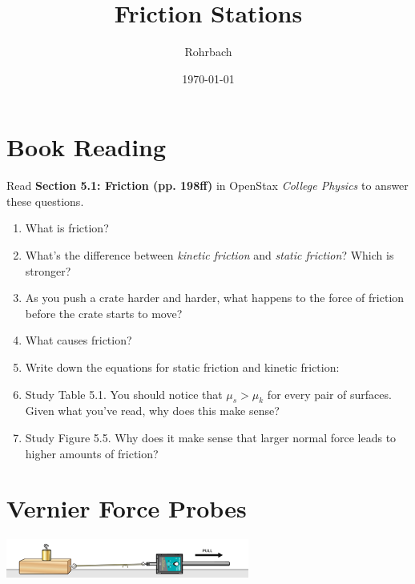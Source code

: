 \documentclass[10pt]{exam}
\title{Friction Stations}
\author{Rohrbach}
\date{\today}
\begin{document}
\maketitle


\section{Book Reading} \label{book}

Read {\bf Section 5.1: Friction (pp. 198ff)} in OpenStax \emph{College Physics} to answer these questions.

\begin{enumerate}
  \item 
    What is friction?
    \vs

  \item
    What's the difference between \emph{kinetic friction} and \emph{static friction}?  Which is stronger?
    \vs

  \item 
    As you push a crate harder and harder, what happens to the force of friction before the crate starts to move?
    \vs

  \item
    What causes friction?
    \vs

  \item 
    Write down the equations for static friction and kinetic friction:
    \vs
  

  \item 
    Study Table 5.1. You should notice that $\mu_s>\mu_k$ for every pair of surfaces.  Given what you've read, why does this make sense?
    \vs

  \item 
    Study Figure 5.5. Why does it make sense that larger normal force leads to higher amounts of friction?
    \vs
\end{enumerate}

\pagebreak


  


\pagebreak
\section{Vernier Force Probes} \label{vernier}

\includegraphics[width=8cm]{friction-lab.PNG}
\end{document}
